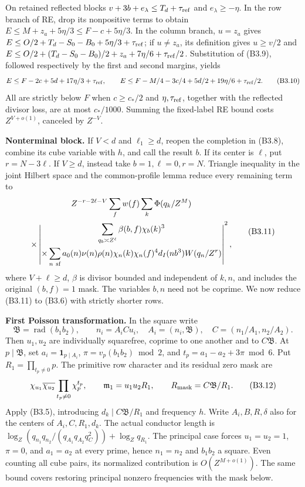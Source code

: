\documentclass[11pt,a4paper]{article}
\begin{document}
On retained reflected blocks \(v+3b+e_\lambda\le T_d+\tau_{\rm ref}\)
and \(e_\lambda\ge-\eta\). In the row branch of RE, drop its nonpositive
terms to obtain \(E\le M+z_a+5\eta/3\le F-c+5\eta/3\). In the column
branch, \(u=z_a\) gives \(E\le O/2+T_d-S_0-B_0+5\eta/3+\tau_{\rm ref}\);
if \(u\ne z_a\), its definition gives \(u\ge v/2\) and
\(E\le O/2+(T_d-S_0-B_0)/2+z_a+7\eta/6+\tau_{\rm ref}/2\). Substitution
of (B3.9), followed respectively by the first and second margins, yields
\[
E\le F-2c+5d+17\eta/3+\tau_{\rm ref},\qquad
E\le F-M/4-3c/4+5d/2+19\eta/6+\tau_{\rm ref}/2.
\tag{B3.10}
\] All are strictly below \(F\) when \(c\ge c_*/2\) and
\(\eta,\allowbreak{}\tau_{\rm ref}\), together with the reflected divisor loss, are
at most \(c_*/1000\). Summing the fixed-label RE bound costs
\(Z^{V+o(1)}\), canceled by \(Z^{-V}\).

\textbf{Nonterminal block.} If \(V<d\) and \(\ell_1\ge d\), reopen the
completion in (B3.8), combine its cube variable with \(h\), and call the
result \(b\). If its center is \(\ell\), put \(r=N-3\ell\). If
\(V\ge d\), instead take \(b=1,\allowbreak{}\ell=0,\allowbreak{}r=N\). Triangle inequality in the
joint Hilbert space and the common-profile lemma reduce every remaining
term to \[
\begin{gathered}
Z^{-r-2\ell-V}\sum_f w(f)\sum_k\Phi(q_k/Z^M)\\
\times\left|\begin{gathered}\sum_{q_b\asymp Z^\ell}\beta(b,f)\chi_b(k)^3\\
\times\sum_{n\ {\rm sf}}a_0(n)\nu(n)\rho(n)\chi_n(k)\chi_n(f)^4
        d_I(nb^3)W(q_n/Z^r)\end{gathered}\right|^2,
\end{gathered}
\tag{B3.11}
\] where \(V+\ell\ge d\), \(\beta\) is divisor bounded and independent
of \(k,\allowbreak{}n\), and includes the original \((b,\allowbreak{}f)=1\) mask. The variables
\(b,\allowbreak{}n\) need not be coprime. We now reduce (B3.11) to (B3.6) with
strictly shorter rows.

\textbf{First Poisson transformation.} In the square write \[
\mathfrak B=\operatorname{rad}(b_1b_2),\qquad
n_i=A_iCu_i,\quad A_i=(n_i,\mathfrak B),\quad
C=(n_1/A_1,n_2/A_2).
\] Then \(u_1,\allowbreak{}u_2\) are individually squarefree, coprime to one another
and to \(C\mathfrak B\). At \(p\mid\mathfrak B\), set
\(a_i=\mathbf1_{p\mid A_i}\), \(\pi=v_p(b_1b_2)\bmod2\), and
\(t_p=a_1-a_2+3\pi\bmod6\). Put \(R_1=\prod_{t_p\ne0}p\). The primitive
row character and its residual zero mask are \[
\chi_{u_1}\overline{\chi_{u_2}}\prod_{t_p\ne0}\chi_p^{t_p},
\qquad\mathfrak m_1=u_1u_2R_1,
\qquad R_{\rm mask}=C\mathfrak B/R_1.
\tag{B3.12}
\] Apply (B3.5), introducing \(d_k\mid C\mathfrak B/R_1\) and frequency
\(h\). Write \(A_i,\allowbreak{}B,\allowbreak{}R,\allowbreak{}\delta\) also for the centers of
\(A_i,\allowbreak{}C,\allowbreak{}R_1,\allowbreak{}d_k\). The actual conductor length is
\(\log_Z(q_{n_1}q_{n_2}/(q_{A_1}q_{A_2}q_C^2))+\log_Zq_{R_1}\). The
principal case forces \(u_1=u_2=1\), \(\pi=0\), and \(a_1=a_2\) at every
prime, hence \(n_1=n_2\) and \(b_1b_2\) a square. Even counting all cube
pairs, its normalized contribution is \(O(Z^{M+o(1)})\). The same bound
covers restoring principal nonzero frequencies with the mask below.
\end{document}
